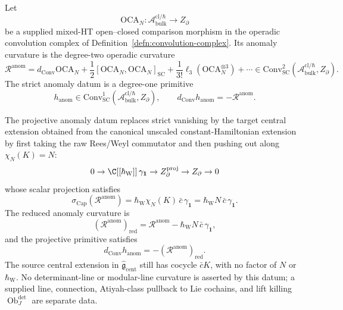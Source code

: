 \begin{defn}
\label{defn:typed-anomaly-locality-datum}
Let
\[
  \mathrm{OCA}_N\colon
  \mathcal A^{\mathrm{cl}/\hbar}_{\mathrm{bulk}}
  \longrightarrow
  Z_\partial
\]
be a supplied mixed-HT open--closed comparison morphism in the operadic
convolution complex of Definition~\ref{defn:convolution-complex}.  Its
anomaly curvature is the degree-two operadic curvature
\[
  \mathcal R^{\mathrm{anom}}
  =
  d_{\mathrm{Conv}}\mathrm{OCA}_N
  +\frac12[\mathrm{OCA}_N,\mathrm{OCA}_N]_{\mathrm{SC}}
  +\frac{1}{3!}\ell_3(\mathrm{OCA}_N^{\otimes3})
  +\cdots
  \in
  \mathrm{Conv}_{\mathrm{SC}}^2(
  \mathcal A^{\mathrm{cl}/\hbar}_{\mathrm{bulk}},Z_\partial).
\]
The strict anomaly datum is a degree-one primitive
\[
  h_{\mathrm{anom}}\in
  \mathrm{Conv}_{\mathrm{SC}}^1(
  \mathcal A^{\mathrm{cl}/\hbar}_{\mathrm{bulk}},Z_\partial),
  \qquad
  d_{\mathrm{Conv}}h_{\mathrm{anom}}
  =-\mathcal R^{\mathrm{anom}} .
\]

The projective anomaly datum replaces strict vanishing by the target
central extension obtained from the canonical unscaled
constant-Hamiltonian extension by first taking the raw Rees/Weyl
commutator and then pushing out along \(\chi_N(K)=N\):
\[
  0\to \C[[\hbar_{\mathrm{W}}]]\,\gamma_{\mathbf 1}
  \to Z_\partial^{\mathrm{proj}}\to Z_\partial\to0
\]
whose scalar projection satisfies
\[
  \sigma_{\mathrm{Cap}}(\mathcal R^{\mathrm{anom}})
  =
  \hbar_{\mathrm{W}}\chi_N(K)\,\bar c\,\gamma_{\mathbf 1}
  =\hbar_{\mathrm{W}}N\,\bar c\,\gamma_{\mathbf 1}.
\]
The reduced anomaly curvature is
\[
  (\mathcal R^{\mathrm{anom}})_{\mathrm{red}}
  =
  \mathcal R^{\mathrm{anom}}
  -\hbar_{\mathrm{W}}N\,\bar c\,\gamma_{\mathbf 1},
\]
and the projective primitive satisfies
\[
  d_{\mathrm{Conv}}h_{\mathrm{anom}}
  =-(\mathcal R^{\mathrm{anom}})_{\mathrm{red}} .
\]
The source central extension in \(\widehat{\mathfrak g}_{\mathrm{cent}}\)
still has cocycle \(\bar c K\), with no factor of \(N\) or
\(\hbar_{\mathrm W}\).  No determinant-line or modular-line curvature
is asserted by this datum; a supplied line, connection, Atiyah-class
pullback to Lie cochains, and lift killing
\(\operatorname{Ob}^{\det}_J\) are separate data.


\end{defn}
